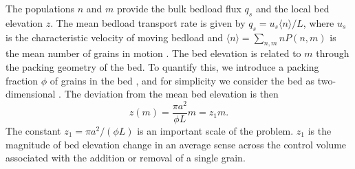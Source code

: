 \documentclass[draft]{agujournal2018}
\begin{document}
The populations $n$ and $m$ provide the bulk bedload flux $q_s$ and the local bed elevation $z$.
The mean bedload transport rate is given by $q_s = u_s\langle n \rangle/L$, where $u_s$ is the characteristic velocity of moving bedload and $\langle n \rangle = 
\sum_{n,m}nP(n,m) $ is the mean number of grains in motion \citep{Charru2004, Ancey2008, Furbish2012a}.
The bed elevation is related to $m$ through the packing geometry of the bed.
To quantify this, we introduce a packing fraction $\phi$ of grains in the bed \citep{Bennett1972}, and for simplicity we consider the bed as two-dimensional \citep{Einstein1950, Paintal1971}. The deviation from the mean bed elevation is then
\begin{equation} z(m) = \frac{\pi a^2}{\phi L}m = z_1 m. \label{eq:ele}\end{equation}
The constant $z_1 = \pi a^2/(\phi L)$ is an important scale of the problem. 
$z_1$ is the magnitude of bed elevation change in an average sense across the control volume associated with the addition or removal of a single grain.
\end{document}
